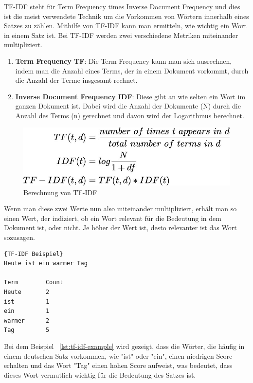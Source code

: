 TF-IDF steht für Term Frequency times Inverse Document Frequency und dies ist die meist verwendete Technik um die Vorkommen von Wörtern innerhalb eines Satzes zu zählen.
Mithilfe von TF-IDF kann man ermitteln, wie wichtig ein Wort in einem Satz ist.
Bei TF-IDF werden zwei verschiedene Metriken miteinander multipliziert.\cite{tfIdf}

\begin{enumerate}
    \item \textbf{Term Frequency TF}: Die Term Frequency kann man sich ausrechnen, indem man die Anzahl eines Terms, der in einem Dokument vorkommt, durch die Anzahl der Terme insgesamt rechnet.
    \item \textbf{Inverse Document Frequency IDF}: Diese gibt an wie selten ein Wort im ganzen Dokument ist.
    Dabei wird die Anzahl der Dokumente (N) durch die Anzahl des Terms (n) gerechnet und davon wird der Logarithmus berechnet.
\end{enumerate}

\begin{figure}[hbt!]
    \centering
    \includegraphics[scale=0.35]{pics/tf_idf}
    \caption{Berechnung von TF-IDF~\cite{tfIdfImage}}
    \label{fig:tf-idf}
\end{figure}

Wenn man diese zwei Werte nun also miteinander multipliziert, erhält man so einen Wert, der indiziert, ob ein Wort relevant für die Bedeutung in dem Dokument ist, oder nicht.
Je höher der Wert ist, desto relevanter ist das Wort sozusagen.

\begin{lstlisting}[label={lst:tf-idf-example},caption={TF-IDF Beispiel}]{TF-IDF Beispiel}
Heute ist ein warmer Tag

Term        Count
Heute       2
ist         1
ein         1
warmer      2
Tag         5
\end{lstlisting}

Bei dem Beispiel ~\ref{lst:tf-idf-example} wird gezeigt, dass die Wörter, die häufig in einem deutschen Satz vorkommen, wie "ist" oder "ein", einen niedrigen Score erhalten und das Wort "Tag" einen hohen Score aufweist, was bedeutet, dass dieses Wort vermutlich wichtig für die Bedeutung des Satzes ist.

